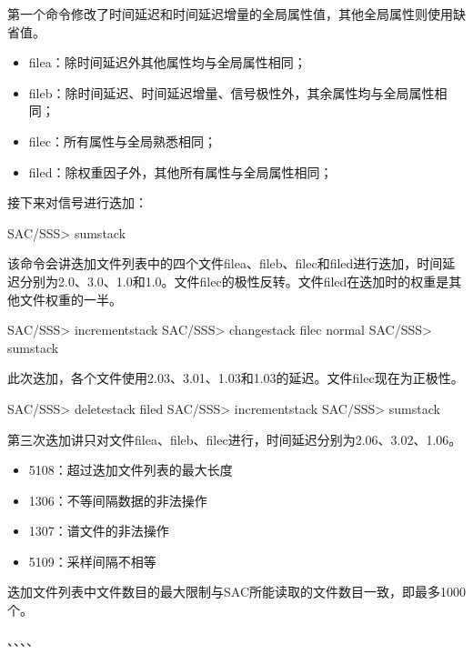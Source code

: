 第一个命令修改了时间延迟和时间延迟增量的全局属性值，其他全局属性则使用缺省值。
\begin{itemize}
\item filea：除时间延迟外其他属性均与全局属性相同；
\item fileb：除时间延迟、时间延迟增量、信号极性外，其余属性均与全局属性相同；
\item filec：所有属性与全局熟悉相同；
\item filed：除权重因子外，其他所有属性与全局属性相同；
\end{itemize}

接下来对信号进行迭加：
\begin{SACCode}
SAC/SSS> sumstack
\end{SACCode}

该命令会讲迭加文件列表中的四个文件filea、fileb、filec和filed进行迭加，时间延迟分别为2.0、3.0、1.0和1.0。文件filec的极性反转。文件filed在迭加时的权重是其他文件权重的一半。

\begin{SACCode}
SAC/SSS> incrementstack
SAC/SSS> changestack filec normal
SAC/SSS> sumstack
\end{SACCode}

此次迭加，各个文件使用2.03、3.01、1.03和1.03的延迟。文件filec现在为正极性。

\begin{SACCode}
SAC/SSS> deletestack filed
SAC/SSS> incrementstack
SAC/SSS> sumstack
\end{SACCode}

第三次迭加讲只对文件filea、fileb、filec进行，时间延迟分别为2.06、3.02、1.06。

\begin{itemize}
\item 5108：超过迭加文件列表的最大长度
\item 1306：不等间隔数据的非法操作
\item 1307：谱文件的非法操作
\item 5109：采样间隔不相等
\end{itemize}

迭加文件列表中文件数目的最大限制与SAC所能读取的文件数目一致，即最多1000个。

、、、、




